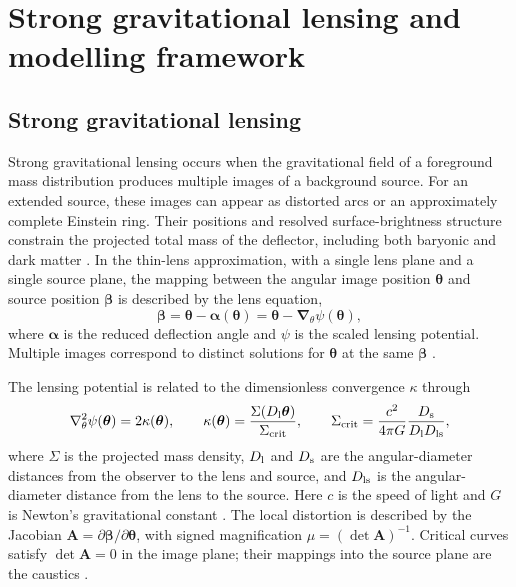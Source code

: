 \documentclass[11pt,a4paper]{article}
\begin{document}
\setcounter{section}{1}
\section{Strong gravitational lensing and modelling framework}
\label{sec:lensing_framework}

\subsection{Strong gravitational lensing}
\label{sec:lensing_basics}

Strong gravitational lensing occurs when the gravitational field of a foreground mass distribution produces multiple images of a background source. For an extended source, these images can appear as distorted arcs or an approximately complete Einstein ring. Their positions and resolved surface-brightness structure constrain the projected total mass of the deflector, including both baryonic and dark matter \citep{Shajib2024}. In the thin-lens approximation, with a single lens plane and a single source plane, the mapping between the angular image position $\boldsymbol{\theta}$ and source position $\boldsymbol{\beta}$ is described by the lens equation,
\begin{equation}
    \boldsymbol{\beta}
    = \boldsymbol{\theta}-\boldsymbol{\alpha}(\boldsymbol{\theta})
    = \boldsymbol{\theta}-\boldsymbol{\nabla}_{\theta}\psi(\boldsymbol{\theta}),
    \label{eq:lens_equation}
\end{equation}
where $\boldsymbol{\alpha}$ is the reduced deflection angle and $\psi$ is the scaled lensing potential. Multiple images correspond to distinct solutions for $\boldsymbol{\theta}$ at the same $\boldsymbol{\beta}$ \citep{Saha2024}.

The lensing potential is related to the dimensionless convergence $\kappa$ through
\begin{equation}
    \nabla_{\theta}^{2}\psi(\boldsymbol{\theta})=2\kappa(\boldsymbol{\theta}),
    \qquad
    \kappa(\boldsymbol{\theta})
    =\frac{\Sigma(D_{\rm l}\boldsymbol{\theta})}{\Sigma_{\rm crit}},
    \qquad
    \Sigma_{\rm crit}
    =\frac{c^{2}}{4\pi G}\frac{D_{\rm s}}{D_{\rm l}D_{\rm ls}},
    \label{eq:convergence}
\end{equation}
where $\Sigma$ is the projected mass density, $D_{\rm l}$ and $D_{\rm s}$ are the angular-diameter distances from the observer to the lens and source, and $D_{\rm ls}$ is the angular-diameter distance from the lens to the source. Here $c$ is the speed of light and $G$ is Newton's gravitational constant \citep{Saha2024}. The local distortion is described by the Jacobian $\mathbf{A}=\partial\boldsymbol{\beta}/\partial\boldsymbol{\theta}$, with signed magnification $\mu=(\det\mathbf{A})^{-1}$. Critical curves satisfy $\det\mathbf{A}=0$ in the image plane; their mappings into the source plane are the caustics \citep{Saha2024}.
\end{document}
